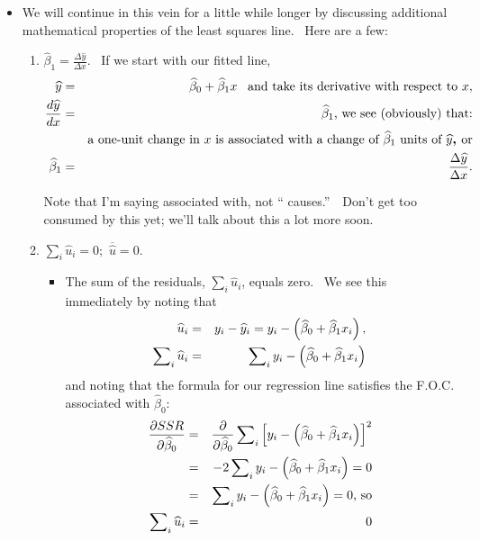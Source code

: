 \documentclass[11pt]{article}
\begin{document}
\begin{itemize}
\item We will continue in this vein for a little while longer by discussing
additional mathematical properties of the least squares line. \ Here are a
few:

\begin{enumerate}
\item $\widehat{\beta }_{1}=\frac{\Delta \widehat{y}}{\Delta x}.$ \ If we
start with our fitted line, 
\begin{eqnarray*}
\widehat{y} &=&\widehat{\beta }_{0}+\widehat{\beta }_{1}x\,\ \text{\ and
take its derivative with respect to }x, \\
\frac{d\widehat{y}}{dx} &=&\widehat{\beta }_{1}\text{, we see (obviously)
that:} \\
&&\text{a one-unit change in }x\text{ is associated with a change of }%
\widehat{\beta }_{1}\text{ units of }\widehat{y}\text{\textbf{, }or} \\
\widehat{\beta }_{1} &=&\frac{\Delta \widehat{y}}{\Delta x}.
\end{eqnarray*}

Note that I'm saying associated with, not \textquotedblleft
causes.\textquotedblright\ \ Don't get too consumed by this yet; we'll talk
about this a lot more soon.

\item $\sum\nolimits_{i}\widehat{u}_{i}=0;$ $\overline{\widehat{u}}=0.$

\begin{itemize}
\item The sum of the residuals, $\sum\nolimits_{i}\widehat{u}_{i}$, equals
zero. \ We see this immediately by noting that%
\begin{eqnarray*}
\widehat{u}_{i} &=&y_{i}-\widehat{y}_{i}=y_{i}-\left( \widehat{\beta }_{0}+%
\widehat{\beta }_{1}x_{i}\right) , \\
\sum\nolimits_{i}\widehat{u}_{i} &=&\sum\nolimits_{i}y_{i}-\left( \widehat{%
\beta }_{0}+\widehat{\beta }_{1}x_{i}\right)
\end{eqnarray*}%
and noting that the formula for our regression line satisfies the F.O.C.
associated with $\widehat{\beta }_{0}:$ 
\begin{eqnarray*}
\frac{\partial SSR}{\partial \widehat{\beta }_{0}} &=&\frac{\partial }{%
\partial \widehat{\beta }_{0}}\sum\nolimits_{i}\left[ y_{i}-\left( \widehat{%
\beta }_{0}+\widehat{\beta }_{1}x_{i}\right) \right] ^{2} \\
&=&-2\sum\nolimits_{i}y_{i}-\left( \widehat{\beta }_{0}+\widehat{\beta }%
_{1}x_{i}\right) =0 \\
&=&\sum\nolimits_{i}y_{i}-\left( \widehat{\beta }_{0}+\widehat{\beta }%
_{1}x_{i}\right) =0\text{, so} \\
\sum\nolimits_{i}\widehat{u}_{i} &=&0
\end{eqnarray*}


\end{itemize}
\end{enumerate}
\end{itemize}
\end{document}
